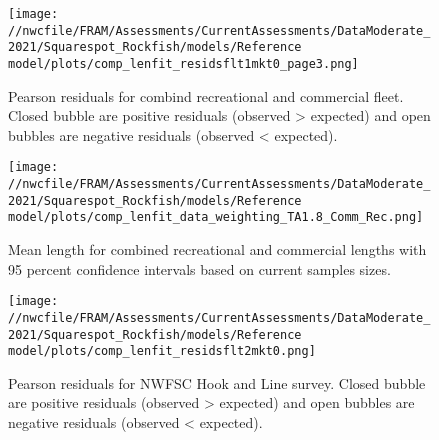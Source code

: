 \documentclass[11pt,
  english,
  a4paper,
]{article}
\begin{document}
\tagmcend\tagstructend


\begin{figure}
\centering
\texttt{[image: //nwcfile/FRAM/Assessments/CurrentAssessments/DataModerate\_2021/Squarespot\_Rockfish/models/Reference model/plots/comp\_lenfit\_residsflt1mkt0\_page3.png]}
\caption{Pearson residuals for combind recreational and commercial fleet. Closed bubble are positive residuals (observed \textgreater{} expected) and open bubbles are negative residuals (observed \textless{} expected).\label{fig:rec-com-pearson}}
\end{figure}

\tagmcend\tagstructend


\begin{figure}
\centering
\texttt{[image: //nwcfile/FRAM/Assessments/CurrentAssessments/DataModerate\_2021/Squarespot\_Rockfish/models/Reference model/plots/comp\_lenfit\_data\_weighting\_TA1.8\_Comm\_Rec.png]}
\caption{Mean length for combined recreational and commercial lengths with 95 percent confidence intervals based on current samples sizes.\label{fig:rec-com-mean-len-fit}}
\end{figure}

\tagmcend\tagstructend


\begin{figure}
\centering
\texttt{[image: //nwcfile/FRAM/Assessments/CurrentAssessments/DataModerate\_2021/Squarespot\_Rockfish/models/Reference model/plots/comp\_lenfit\_residsflt2mkt0.png]}
\caption{Pearson residuals for NWFSC Hook and Line survey. Closed bubble are positive residuals (observed \textgreater{} expected) and open bubbles are negative residuals (observed \textless{} expected).\label{fig:hkl-pearson}}
\end{figure}
\end{document}
